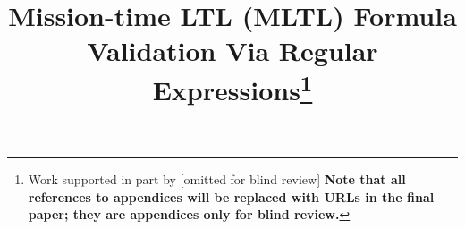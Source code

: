 \documentclass[runningheads]{llncs}
\begin{document}
%
\title{Mission-time LTL (MLTL) Formula Validation Via Regular Expressions\thanks{Work supported in part by [omitted for blind review] {\bf Note that all references to appendices will be replaced with URLs in the final paper; they are appendices only for blind review.}}}
%
%
\vspace{-0.1in}
%
%
%
\maketitle              %
%
\end{document}

